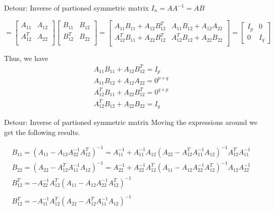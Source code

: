 \documentclass{beamer}
\begin{document}
\begin{frame}{Detour: Inverse of partioned symmetric matrix}
$I_n = AA^{-1} = AB$

$=\begin{bmatrix}
A_{11} & A_{12}\\
A_{12}^T & A_{22} \\
\end{bmatrix} \begin{bmatrix}
B_{11} & B_{12}\\
B_{12}^T & B_{22} \\
\end{bmatrix}
= \begin{bmatrix}
A_{11}B_{11} +A_{12}B_{12}^T & A_{11}B_{12} + A_{12}A_{22}\\
A_{12}^TB_{11} + A_{22}B_{12}^T & A_{12}^TB_{12} + A_{22}B_{22}  \\
\end{bmatrix} = \begin{bmatrix}
I_p & 0 \\
0 & I_q
\end{bmatrix}$

Thus, we have
\begin{gather}
A_{11}B_{11} +A_{12}B_{12}^T = I_p\\
A_{11}B_{12} + A_{12}A_{22} = 0^{p\times q}\\
A_{12}^TB_{11} + A_{22}B_{12}^T = 0^{q\times p}\\
A_{12}^TB_{12} + A_{22}B_{22} = I_q
\end{gather}
\end{frame}

\begin{frame}{Detour: Inverse of partioned symmetric matrix}
Moving the expressions around we get the following results.

\begin{gather}
	B_{11} = (A_{11} - A_{12}A_{22}^{-1}A_{12}^T)^{-1} = A_{11}^{-1} + A_{11}^{-1}A_{12}(A_{22} - A_{12}^TA_{11}^{-1}A_{12})^{-1}A_{12}^TA_{11}^{-1}\\
	B_{22} = (A_{22} - A_{12}^TA_{11}^{-1}A_{12})^{-1} = A_{22}^{-1} + A_{22}^{-1}A_{12}^T(A_{11} - A_{12}A_{22}^{-1}A_{12}^T)^{-1}A_{12}A_{22}^{-1}\\
	B_{12}^T = - A_{22}^{-1}A_{12}^T ( A_{11} - A_{12} A_{22}^{-1} A_{12}^T)^{-1}\\\\
	B_{12}^T = - A_{11}^{-1}A_{12}^T ( A_{22} - A_{12} ^TA_{11}^{-1} A_{12})^{-1}
\end{gather}
\end{frame}
\end{document}
